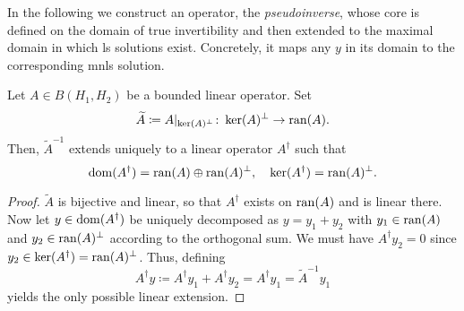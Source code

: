 In the following we construct an operator, the \emph{pseudoinverse}, 
whose core is defined on the domain of true invertibility and then 
extended to the maximal domain in which ls solutions exist.
Concretely, it maps any $y$ in its domain to the corresponding mnls 
solution.
\begin{prop}
    Let $A \in B(H_1,H_2)$ be a bounded linear operator.
    Set 
    \begin{equation*}
        \widetilde A \coloneqq A|_{\ker(A)^\perp}
            \colon \ker(A)^\perp \to \operatorname{ran}(A).
    \end{equation*}
    Then, $\widetilde A^{-1}$ extends uniquely to a linear operator
    $A^\dagger$ such that 
    \begin{equation*}
        \operatorname{dom}(A^\dagger) = \operatorname{ran}(A) \oplus \operatorname{ran}(A)^\perp, \quad
        \ker(A^\dagger) = \operatorname{ran}(A)^\perp.
    \end{equation*}
\end{prop}
\begin{proof}
    $\widetilde A$ is bijective and linear, so that $A^\dagger$ exists 
    on $\operatorname{ran}(A)$ and is linear there.
    Now let $y \in \operatorname{dom}(A^\dagger)$ be uniquely decomposed as 
    $y = y_1 + y_2$ with $y_1 \in \operatorname{ran}(A)$ and $y_2 \in \operatorname{ran}(A)^\perp$ 
    according to the orthogonal sum.
    We must have $A^\dagger y_2 = 0$ since 
    $y_2 \in \ker(A^\dagger) = \operatorname{ran}(A)^\perp$.
    Thus, defining
    \begin{equation*}
        A^\dagger y \coloneqq A^\dagger y_1 + A^\dagger y_2 
        = A^\dagger y_1 = \widetilde{A}^{-1} y_1
    \end{equation*}
    yields the only possible linear extension.
\end{proof}

